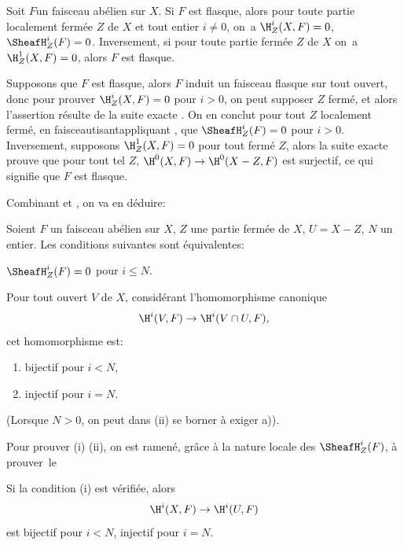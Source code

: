 \begin{corollaire} \label{I.2.12}
Soit $F$\pageoriginale un faisceau ab\'elien sur $X$. Si $F$ est flasque, alors pour toute partie localement ferm\'ee $Z$ de $X$ et tout entier $i\neq 0$, on~a $\H^i_Z(X, F)=0$, $\SheafH^i_Z(F)=0$. Inversement, si pour toute partie ferm\'ee $Z$ de $X$ on~a $\H_Z^1(X, F)=0$, alors $F$ est flasque.
\end{corollaire}

Supposons que $F$ est flasque, alors $F$ induit un faisceau flasque sur tout ouvert, donc pour prouver $\H^i_Z(X, F)=0$ pour $i>0$, on peut supposer $Z$ ferm\'e, et alors l'assertion r\'esulte de la suite exacte . On en conclut pour tout $Z$ localement ferm\'e, en \og faisceautisant\fg \ie appliquant , que $\SheafH^i_Z(F)=0$ pour $i>0$. Inversement, supposons $\H^1_Z(X, F)=0$ pour tout ferm\'e $Z$, alors la suite exacte  prouve que pour tout tel $Z$, $\H^0(X, F) \to \H^0(X-Z, F)$ est surjectif, ce qui signifie que $F$ est flasque.

Combinant  et , on va en d\'eduire:

\begin{proposition} \label{I.2.13}
Soient $F$ un faisceau ab\'elien sur $X$, $Z$ une partie ferm\'ee de $X$, $U=X-Z$, $N$ un entier. Les conditions suivantes sont \'equivalentes:
\begin{enumeratei}
\item
$\SheafH^i_Z(F)=0$ pour $i\leq N$.
\item
Pour tout ouvert $V$ de $X$, consid\'erant l'homomorphisme canonique
$$
\H^i(V, F) \to \H^i(V\cap U, F),$$
cet homomorphisme est:
\begin{enumerate}
\item[\textup{a)}] bijectif pour $i<N$,
\item[\textup{b)}] injectif pour $i=N$.
\end{enumerate}
\end{enumeratei}
\noindent
(Lorsque $N>0$, on peut dans \textup{(ii)} se borner \`a exiger \textup{a)}).
\end{proposition}

Pour prouver (i) \ALORS (ii), on est ramen\'e, gr\^ace \`a la nature locale des $\SheafH_Z^i(F)$, \`a prouver~le

\begin{corollaire} \label{I.2.14}
Si la condition  (i) est v\'erifi\'ee, alors
$$
\H^i(X, F) \to \H^i(U, F)$$
est bijectif pour $i<N$, injectif pour $i=N$.
\end{corollaire}

